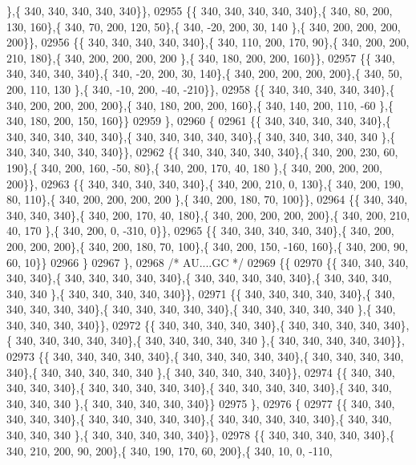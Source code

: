 \begin{DoxyCode}
      \},\{ 340, 340, 340, 340, 340\}\},
02955 \{\{ 340, 340, 340, 340, 340\},\{ 340,  80, 200, 130, 160\},\{ 340,  70, 200, 120,  50\},\{ 340, -20, 200,  30, 140
      \},\{ 340, 200, 200, 200, 200\}\},
02956 \{\{ 340, 340, 340, 340, 340\},\{ 340, 110, 200, 170,  90\},\{ 340, 200, 200, 210, 180\},\{ 340, 200, 200, 200, 200
      \},\{ 340, 180, 200, 200, 160\}\},
02957 \{\{ 340, 340, 340, 340, 340\},\{ 340, -20, 200,  30, 140\},\{ 340, 200, 200, 200, 200\},\{ 340,  50, 200, 110, 130
      \},\{ 340, -10, 200, -40, -210\}\},
02958 \{\{ 340, 340, 340, 340, 340\},\{ 340, 200, 200, 200, 200\},\{ 340, 180, 200, 200, 160\},\{ 340, 140, 200, 110, -60
      \},\{ 340, 180, 200, 150, 160\}\}
02959 \},
02960 \{
02961 \{\{ 340, 340, 340, 340, 340\},\{ 340, 340, 340, 340, 340\},\{ 340, 340, 340, 340, 340\},\{ 340, 340, 340, 340, 340
      \},\{ 340, 340, 340, 340, 340\}\},
02962 \{\{ 340, 340, 340, 340, 340\},\{ 340, 200, 230,  60, 190\},\{ 340, 200, 160, -50,  80\},\{ 340, 200, 170,  40, 180
      \},\{ 340, 200, 200, 200, 200\}\},
02963 \{\{ 340, 340, 340, 340, 340\},\{ 340, 200, 210,   0, 130\},\{ 340, 200, 190,  80, 110\},\{ 340, 200, 200, 200, 200
      \},\{ 340, 200, 180,  70, 100\}\},
02964 \{\{ 340, 340, 340, 340, 340\},\{ 340, 200, 170,  40, 180\},\{ 340, 200, 200, 200, 200\},\{ 340, 200, 210,  40, 170
      \},\{ 340, 200,   0, -310,   0\}\},
02965 \{\{ 340, 340, 340, 340, 340\},\{ 340, 200, 200, 200, 200\},\{ 340, 200, 180,  70, 100\},\{ 340, 200, 150, -160, 
      160\},\{ 340, 200,  90,  60,  10\}\}
02966 \}
02967 \},
02968 \textcolor{comment}{/* AU....GC */}
02969 \{\{
02970 \{\{ 340, 340, 340, 340, 340\},\{ 340, 340, 340, 340, 340\},\{ 340, 340, 340, 340, 340\},\{ 340, 340, 340, 340, 340
      \},\{ 340, 340, 340, 340, 340\}\},
02971 \{\{ 340, 340, 340, 340, 340\},\{ 340, 340, 340, 340, 340\},\{ 340, 340, 340, 340, 340\},\{ 340, 340, 340, 340, 340
      \},\{ 340, 340, 340, 340, 340\}\},
02972 \{\{ 340, 340, 340, 340, 340\},\{ 340, 340, 340, 340, 340\},\{ 340, 340, 340, 340, 340\},\{ 340, 340, 340, 340, 340
      \},\{ 340, 340, 340, 340, 340\}\},
02973 \{\{ 340, 340, 340, 340, 340\},\{ 340, 340, 340, 340, 340\},\{ 340, 340, 340, 340, 340\},\{ 340, 340, 340, 340, 340
      \},\{ 340, 340, 340, 340, 340\}\},
02974 \{\{ 340, 340, 340, 340, 340\},\{ 340, 340, 340, 340, 340\},\{ 340, 340, 340, 340, 340\},\{ 340, 340, 340, 340, 340
      \},\{ 340, 340, 340, 340, 340\}\}
02975 \},
02976 \{
02977 \{\{ 340, 340, 340, 340, 340\},\{ 340, 340, 340, 340, 340\},\{ 340, 340, 340, 340, 340\},\{ 340, 340, 340, 340, 340
      \},\{ 340, 340, 340, 340, 340\}\},
02978 \{\{ 340, 340, 340, 340, 340\},\{ 340, 210, 200,  90, 200\},\{ 340, 190, 170,  60, 200\},\{ 340,  10,   0, -110, 

\end{DoxyCode}
